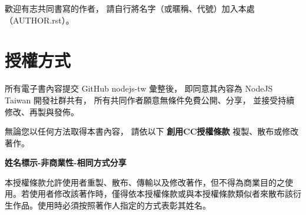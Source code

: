 \documentclass[a4paper,12pt,english]{sphinxmanual}
\begin{document}
歡迎有志共同書寫的作者，
請自行將名字（或暱稱、代號）加入本處（AUTHOR.rst）。


\section{授權方式}
\label{AUTHOR:id2}
所有電子書內容提交 GitHub nodejs-tw 彙整後，
即同意其內容為 NodeJS Taiwan 開發社群共有，
所有共同作者願意無條件免費公開、分享，
並接受持續修改、再製與發佈。

無論您以任何方法取得本書內容，
請依以下 \textbf{創用CC授權條款} 複製、散布或修改著作。

\textbf{姓名標示-非商業性-相同方式分享}

本授權條款允許使用者重製、散布、傳輸以及修改著作，但不得為商業目的之使用。若使用者修改該著作時，僅得依本授權條款或與本授權條款類似者來散布該衍生作品。使用時必須按照著作人指定的方式表彰其姓名。



\renewcommand{\indexname}{Index}
\printindex
\end{document}
